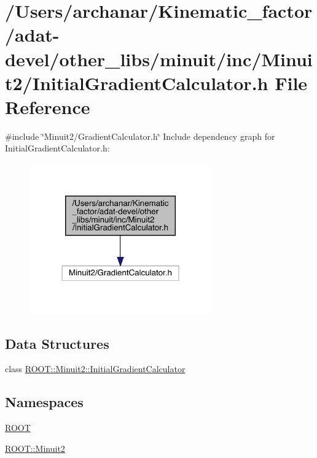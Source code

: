 \hypertarget{adat-devel_2other__libs_2minuit_2inc_2Minuit2_2InitialGradientCalculator_8h}{}\section{/\+Users/archanar/\+Kinematic\+\_\+factor/adat-\/devel/other\+\_\+libs/minuit/inc/\+Minuit2/\+Initial\+Gradient\+Calculator.h File Reference}
\label{adat-devel_2other__libs_2minuit_2inc_2Minuit2_2InitialGradientCalculator_8h}
{\ttfamily \#include \char`\"{}Minuit2/\+Gradient\+Calculator.\+h\char`\"{}}\newline
Include dependency graph for Initial\+Gradient\+Calculator.\+h\+:
\nopagebreak
\begin{figure}[H]
\begin{center}
\leavevmode
\includegraphics[width=222pt]{da/dec/adat-devel_2other__libs_2minuit_2inc_2Minuit2_2InitialGradientCalculator_8h__incl}
\end{center}
\end{figure}
\subsection*{Data Structures}
\begin{DoxyCompactItemize}
\item 
class \mbox{\hyperlink{classROOT_1_1Minuit2_1_1InitialGradientCalculator}{R\+O\+O\+T\+::\+Minuit2\+::\+Initial\+Gradient\+Calculator}}
\end{DoxyCompactItemize}
\subsection*{Namespaces}
\begin{DoxyCompactItemize}
\item 
 \mbox{\hyperlink{namespaceROOT}{R\+O\+OT}}
\item 
 \mbox{\hyperlink{namespaceROOT_1_1Minuit2}{R\+O\+O\+T\+::\+Minuit2}}
\end{DoxyCompactItemize}

